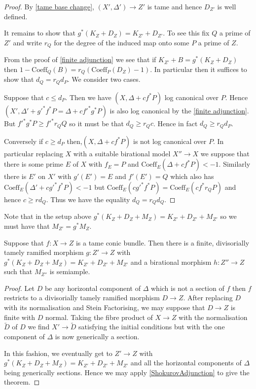 \begin{proof}
	By \autoref{tame base change}, $(X',\Delta') \to Z'$ is tame and hence $D_{Z'}$ is well defined.
	
	It remains to show that $g^{*}(K_{Z}+D_{Z})=K_{Z'}+D_{Z'}$. To see this fix $Q$ a prime of $Z'$ and write $r_{Q}$ for the degree of the induced map onto some $P$ a prime of $Z$. 
	
	From the proof of \autoref{finite adjunction} we see that if $K_{Z'}+B=g^{*}(K_{Z}+D_{Z})$ then $1-\text{Coeff}_{Q}(B)=r_{Q}(\text{Coeff}_{P}(D_{Z})-1)$. In particular then it suffices to show that $d_{Q}=r_{Q}d_{P}$. We consider two cases.
	
	Suppose that $c \leq d_{P}$. Then we have $(X,\Delta+cf^{*}P)$ log canonical over $P$. Hence $(X',\Delta'+g'^{*}f^{*}P=\Delta+cf'^{*}g^{*}P)$ is also log canonical by the \autoref{finite adjunction}. But $f'^{*}g^{*}P \geq f'^{*}r_{Q}Q$ so it must be that $d_{Q} \geq r_{Q}c$. Hence in fact $d_{Q} \geq r_{Q}d_{P}$.
	
	Conversely if $c \geq d_{P}$ then,$(X,\Delta+cf^{*}P)$ is not log canonical over $P$. In particular replacing $X$ with a suitable birational model $X'' \to X$ we suppose that there is some prime $E$ of $X$ with $f_{E}=P$ and $\text{Coeff}_{E}(\Delta+cf^{*}P) < -1$. Similarly there is $E'$ on $X'$ with $g'(E')=E$ and $f'(E')=Q$ which also has $\text{Coeff}_{E}(\Delta'+cg'^{*}f^{*}P) < -1$ but $\text{Coeff}_{E}(cg'^{*}f^{*}P)=\text{Coeff}_{E}(cf^{*}r_{Q}P)$ and hence $c \geq rd_{Q}$. Thus we have the equality $d_{Q}=r_{Q}d_{Q}$.
\end{proof}


Note that in the setup above $g^{*}(K_{Z}+D_{Z}+M_{Z})=K_{Z'}+D_{Z'}+M_{Z'}$ so we must have that $M_{Z'}=g^{*}M_{Z}$.

\begin{lemma}
	Suppose that $f\colon X \to Z$ is a tame conic bundle. Then there is a finite, divisorially tamely ramified morphism $g\colon Z' \to Z$ with $g^{*}(K_{Z}+D_{Z}+M_{Z})=K_{Z'}+D_{Z'}+M_{Z'}$ and a birational morphism $h\colon Z'' \to Z$ such that $M_{Z''}$ is semiample.
\end{lemma}
\begin{proof}
	Let $D$ be any horizontal component of $\Delta$ which is not a section of $f$ then $f$ restricts to a divisorially tamely ramified morphism $D \to Z$. After replacing $D$ with its normalisation and Stein Factorising, we may suppose that $D\to Z$ is finite with $D$ normal. Taking the fibre product of $X \to Z$ with the normalisation $\tilde{D}$ of $D$ we find $X' \to \tilde{D}$ satisfying the initial conditions but with the one component of $\Delta$ is now  generically a section.
	
	 In this fashion, we eventually get to $Z' \to Z$ with $g^{*}(K_{Z}+D_{Z}+M_{Z})=K_{Z'}+D_{Z'}+M_{Z'}$ and all the horizontal components of $\Delta$ being generically sections. Hence we may apply \autoref{ShokurovAdjunction} to give the theorem.
\end{proof}

